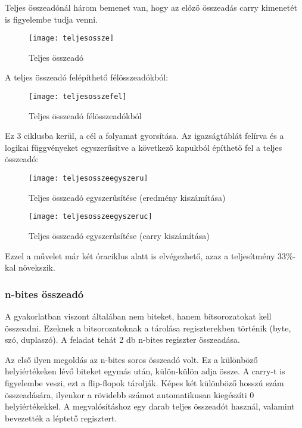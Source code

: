Teljes összeadónál három bemenet van, hogy az előző összeadás carry kimenetét is figyelembe tudja venni.
\begin{figure}[H]
    \texttt{[image: teljesossze]}
    \centering
    \caption{Teljes összeadó}
    \label{fig:teljesossze}
\end{figure}
A teljes összeadó felépíthető félösszeadókból:
\begin{figure}[H]
    \texttt{[image: teljesosszefel]}
    \centering
    \caption{Teljes összeadó félösszeadókból}
    \label{fig:teljesosszefel}
\end{figure}
Ez 3 ciklusba kerül, a cél a folyamat gyorsítása.
Az igazságtáblát felírva és a logikai függvényeket egyszerűsítve a következő kapukból építhető fel a teljes összeadó:
\begin{figure}[H]
    \texttt{[image: teljesosszeegyszeru]}
    \centering
    \caption{Teljes összeadó egyszerűsítése (eredmény kiszámítása)}
    \label{fig:teljesosszeegyszeru}
\end{figure}
\begin{figure}[H]
    \texttt{[image: teljesosszeegyszeruc]}
    \centering
    \caption{Teljes összeadó egyszerűsítése (carry kiszámítása)}
    \label{fig:teljesosszeegyszeruc}
\end{figure}
Ezzel a művelet már két óraciklus alatt is elvégezhető, azaz a teljesítmény 33\%-kal növekszik.

\subsubsection{n-bites összeadó}
A gyakorlatban viszont általában nem biteket, hanem bitsorozatokat kell összeadni.
Ezeknek a bitsorozatoknak a tárolása regiszterekben történik (byte, szó, duplaszó).
A feladat tehát 2 db n-bites regiszter összeadása.

Az első ilyen megoldás az n-bites soros összeadó volt.
Ez a különböző helyiértékeken lévő biteket egymás után, külön-külön adja össze.
A carry-t is figyelembe veszi, ezt a flip-flopok tárolják.
Képes két különböző hosszú szám összeadására, ilyenkor a rövidebb számot automatikusan kiegészíti 0 helyiértékekkel.
A megvalósításhoz egy darab teljes összeadót használ, valamint bevezették a léptető regisztert.

